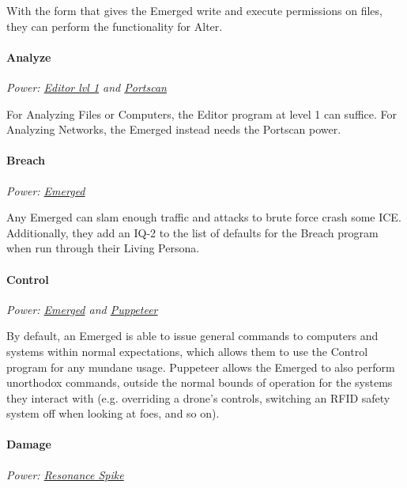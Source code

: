 \begin{multicols*}{3}
	With the form that gives the Emerged write and execute permissions on files, they can perform the functionality for Alter.

	\paragraph{Analyze}
	\begin{center}
		\textit{Power: \hyperref[editor]{Editor lvl 1} and \hyperref[portscan]{Portscan}}
	\end{center}

	For Analyzing Files or Computers, the Editor program at level 1 can suffice. For Analyzing Networks, the Emerged instead needs the Portscan power.

	\paragraph{Breach}
	\begin{center}
		\textit{Power: \hyperref[emerged]{Emerged}}
	\end{center}

	Any Emerged can slam enough traffic and attacks to brute force crash some ICE. Additionally, they add an IQ-2 to the list of defaults for the Breach program when run through their Living Persona.
	
	\paragraph{Control}
	\begin{center}
		\textit{Power: \hyperref[emerged]{Emerged} and \hyperref[puppeteer]{Puppeteer}}
	\end{center}

	By default, an Emerged is able to issue general commands to computers and systems within normal expectations, which allows them to use the Control program for any mundane usage. Puppeteer allows the Emerged to also perform unorthodox commands, outside the normal bounds of operation for the systems they interact with (e.g. overriding a drone's controls, switching an RFID safety system off when looking at foes, and so on).
	
	\paragraph{Damage}
	\begin{center}
		\textit{Power: \hyperref[resonance_spike]{Resonance Spike}}
	\end{center}


\end{multicols*}
